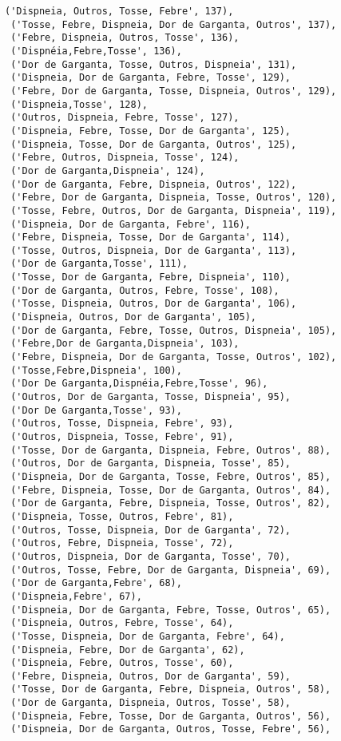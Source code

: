\documentclass[11pt]{article}
\begin{document}
\begin{tcolorbox}[breakable, size=fbox, boxrule=.5pt, pad at break*=1mm, opacityfill=0]
\begin{Verbatim}[commandchars=\\\{\}]
 ('Dispneia, Outros, Tosse, Febre', 137),
 ('Tosse, Febre, Dispneia, Dor de Garganta, Outros', 137),
 ('Febre, Dispneia, Outros, Tosse', 136),
 ('Dispnéia,Febre,Tosse', 136),
 ('Dor de Garganta, Tosse, Outros, Dispneia', 131),
 ('Dispneia, Dor de Garganta, Febre, Tosse', 129),
 ('Febre, Dor de Garganta, Tosse, Dispneia, Outros', 129),
 ('Dispneia,Tosse', 128),
 ('Outros, Dispneia, Febre, Tosse', 127),
 ('Dispneia, Febre, Tosse, Dor de Garganta', 125),
 ('Dispneia, Tosse, Dor de Garganta, Outros', 125),
 ('Febre, Outros, Dispneia, Tosse', 124),
 ('Dor de Garganta,Dispneia', 124),
 ('Dor de Garganta, Febre, Dispneia, Outros', 122),
 ('Febre, Dor de Garganta, Dispneia, Tosse, Outros', 120),
 ('Tosse, Febre, Outros, Dor de Garganta, Dispneia', 119),
 ('Dispneia, Dor de Garganta, Febre', 116),
 ('Febre, Dispneia, Tosse, Dor de Garganta', 114),
 ('Tosse, Outros, Dispneia, Dor de Garganta', 113),
 ('Dor de Garganta,Tosse', 111),
 ('Tosse, Dor de Garganta, Febre, Dispneia', 110),
 ('Dor de Garganta, Outros, Febre, Tosse', 108),
 ('Tosse, Dispneia, Outros, Dor de Garganta', 106),
 ('Dispneia, Outros, Dor de Garganta', 105),
 ('Dor de Garganta, Febre, Tosse, Outros, Dispneia', 105),
 ('Febre,Dor de Garganta,Dispneia', 103),
 ('Febre, Dispneia, Dor de Garganta, Tosse, Outros', 102),
 ('Tosse,Febre,Dispneia', 100),
 ('Dor De Garganta,Dispnéia,Febre,Tosse', 96),
 ('Outros, Dor de Garganta, Tosse, Dispneia', 95),
 ('Dor De Garganta,Tosse', 93),
 ('Outros, Tosse, Dispneia, Febre', 93),
 ('Outros, Dispneia, Tosse, Febre', 91),
 ('Tosse, Dor de Garganta, Dispneia, Febre, Outros', 88),
 ('Outros, Dor de Garganta, Dispneia, Tosse', 85),
 ('Dispneia, Dor de Garganta, Tosse, Febre, Outros', 85),
 ('Febre, Dispneia, Tosse, Dor de Garganta, Outros', 84),
 ('Dor de Garganta, Febre, Dispneia, Tosse, Outros', 82),
 ('Dispneia, Tosse, Outros, Febre', 81),
 ('Outros, Tosse, Dispneia, Dor de Garganta', 72),
 ('Outros, Febre, Dispneia, Tosse', 72),
 ('Outros, Dispneia, Dor de Garganta, Tosse', 70),
 ('Outros, Tosse, Febre, Dor de Garganta, Dispneia', 69),
 ('Dor de Garganta,Febre', 68),
 ('Dispneia,Febre', 67),
 ('Dispneia, Dor de Garganta, Febre, Tosse, Outros', 65),
 ('Dispneia, Outros, Febre, Tosse', 64),
 ('Tosse, Dispneia, Dor de Garganta, Febre', 64),
 ('Dispneia, Febre, Dor de Garganta', 62),
 ('Dispneia, Febre, Outros, Tosse', 60),
 ('Febre, Dispneia, Outros, Dor de Garganta', 59),
 ('Tosse, Dor de Garganta, Febre, Dispneia, Outros', 58),
 ('Dor de Garganta, Dispneia, Outros, Tosse', 58),
 ('Dispneia, Febre, Tosse, Dor de Garganta, Outros', 56),
 ('Dispneia, Dor de Garganta, Outros, Tosse, Febre', 56),

\end{Verbatim}
\end{tcolorbox}
\end{document}
